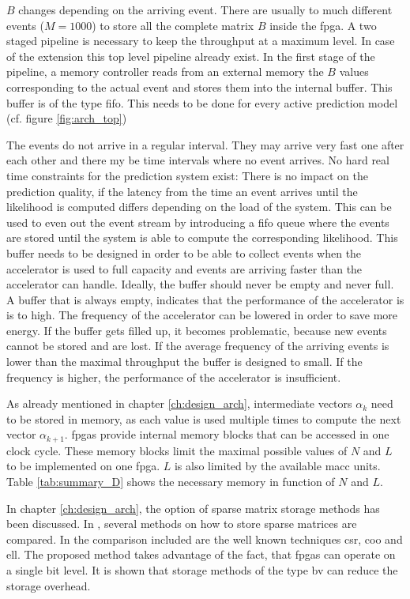 \documentclass[mscthesis]{usiinfthesis}
\begin{document}
$B$ changes depending on the arriving event. There are usually to much
different events ($M=1000$) to store all the complete matrix $B$ inside the
\gls{fpga}. A two staged pipeline is necessary to keep the throughput at
a maximum level. In case of the extension this top level pipeline already
exist. In the first stage of the pipeline, a memory controller reads from an
external memory the $B$ values corresponding to the actual event and stores
them into the internal buffer. This buffer is of the type \gls{fifo}. This
needs to be done for every active prediction model (cf.  figure
\ref{fig:arch_top})

The events do not arrive in a regular interval. They may arrive very fast one
after each other and there my be time intervals where no event arrives. No hard
real time constraints for the prediction system exist: There is no impact on
the prediction quality, if the latency from the time an event arrives until the
likelihood is computed differs depending on the load of the system. This can be
used to even out the event stream by introducing a \gls{fifo} queue where the
events are stored until the system is able to compute the corresponding
likelihood. This buffer needs to be designed in order to be able to collect
events when the accelerator is used to full capacity and events are arriving
faster than the accelerator can handle. Ideally, the buffer should never be
empty and never full. A buffer that is always empty, indicates that the
performance of the accelerator is is to high. The frequency of the accelerator
can be lowered in order to save more energy. If the buffer gets filled up, it
becomes problematic, because new events cannot be stored and are lost. If the
average frequency of the arriving events is lower than the maximal throughput
the buffer is designed to small.  If the frequency is higher, the performance
of the accelerator is insufficient.

As already mentioned in chapter \ref{ch:design_arch}, intermediate vectors
$\alpha_k$ need to be stored in memory, as each value is used multiple times to
compute the next vector $\alpha_{k+1}$. \glspl{fpga} provide internal memory
blocks that can be accessed in one clock cycle. These memory blocks limit the
maximal possible values of $N$ and $L$ to be implemented on one \gls{fpga}. $L$
is also limited by the available \gls{macc} units. Table \ref{tab:summary_D}
shows the necessary memory in function of $N$ and $L$.

In chapter \ref{ch:design_arch}, the option of sparse matrix storage methods
has been discussed. In \cite{FCCM12_Kestur}, several methods on how to store
sparse matrices are compared. In the comparison included are the well known
techniques \gls{csr}, \gls{coo} and \gls{ell}. The proposed method takes
advantage of the fact, that \glspl{fpga} can operate on a single bit level. It
is shown that storage methods of the type \gls{bv} can reduce the storage
overhead.
\end{document}
